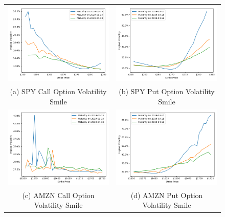 \documentclass[10pt]{article}
\begin{document}
        \begin{figure}
            \begin{tabular}{cc}
                \includegraphics[width=.475\textwidth]{bin/vol_smile/SPY_Call_2DVolSmile.png} &
                \includegraphics[width=.475\textwidth]{bin/vol_smile/SPY_Put_2DVolSmile.png} \\
                (a) SPY Call Option Volatility Smile &
                (b) SPY Put Option Volatility Smile \\
                \includegraphics[width=.475\textwidth]{bin/vol_smile/AMZN_Call_2DVolSmile.png} &
                \includegraphics[width=.475\textwidth]{bin/vol_smile/AMZN_Put_2DVolSmile.png} \\
                (c) AMZN Call Option Volatility Smile &
                (d) AMZN Put Option Volatility Smile
            \end{tabular}
        \end{figure}
\end{document}
